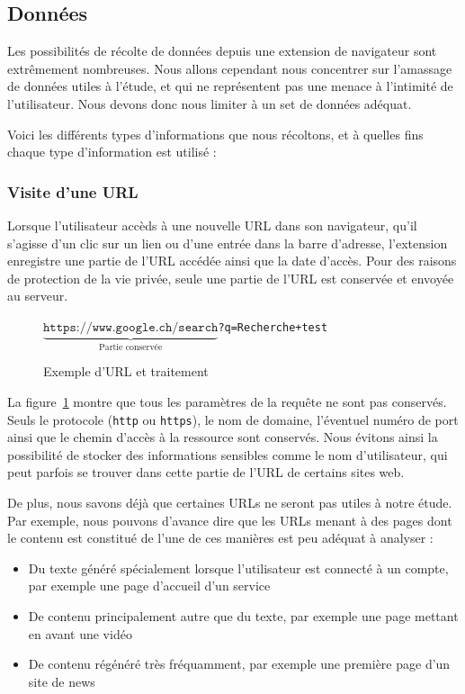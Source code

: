 	\subsection{Données}\label{d-donnees}

		Les possibilités de récolte de données depuis une extension de navigateur sont extrêmement nombreuses. Nous allons cependant nous concentrer sur l'amassage de données utiles à l'étude, et qui ne représentent pas une menace à l'intimité de l'utilisateur. Nous devons donc nous limiter à un set de données adéquat.

		Voici les différents types d'informations que nous récoltons, et à quelles fins chaque type d'information est utilisé :

		\subsubsection{Visite d'une URL}
			
			Lorsque l'utilisateur accèds à une nouvelle URL dans son navigateur, qu'il s'agisse d'un clic sur un lien ou d'une entrée dans la barre d'adresse, l'extension enregistre une partie de l'URL accédée ainsi que la date d'accès. Pour des raisons de protection de la vie privée, seule une partie de l'URL est conservée et envoyée au serveur.

			\begin{figure}[h]
				\centering
				$\underbrace{\texttt{https://www.google.ch/search}}_{\text{Partie conservée}}$\texttt{?q=Recherche+test}
				\caption{Exemple d'URL et traitement}
				\label{d-url}
			\end{figure}

			La figure~\ref{d-url} montre que tous les paramètres de la requête ne sont pas conservés. Seuls le protocole (\texttt{http} ou \texttt{https}), le nom de domaine, l'éventuel numéro de port ainsi que le chemin d'accès à la ressource sont conservés. Nous évitons ainsi la possibilité de stocker des informations sensibles comme le nom d'utilisateur, qui peut parfois se trouver dans cette partie de l'URL de certains sites web.

			De plus, nous savons déjà que certaines URLs ne seront pas utiles à notre étude. Par exemple, nous pouvons d'avance dire que les URLs menant à des pages dont le contenu est constitué de l'une de ces manières est peu adéquat à analyser :
			\begin{itemize}
				\item Du texte généré spécialement lorsque l'utilisateur est connecté à un compte, par exemple une page d'accueil d'un service
				\item De contenu principalement autre que du texte, par exemple une page mettant en avant une vidéo
				\item De contenu régénéré très fréquamment, par exemple une première page d'un site de news
			\end{itemize}
			
